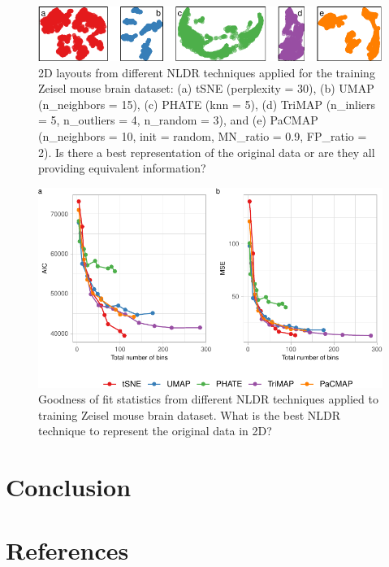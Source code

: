 \documentclass[
  12pt]{article}
\begin{document}
\begin{figure}

{\centering \includegraphics[width=1\textwidth,height=\textheight]{paper_files/figure-pdf/fig-nldervis5Mouse-1.pdf}

}

\caption{\label{fig-nldervis5Mouse}2D layouts from different NLDR
techniques applied for the training Zeisel mouse brain dataset: (a) tSNE
(perplexity = 30), (b) UMAP (n\_neighbors = 15), (c) PHATE (knn = 5),
(d) TriMAP (n\_inliers = 5, n\_outliers = 4, n\_random = 3), and (e)
PaCMAP (n\_neighbors = 10, init = random, MN\_ratio = 0.9, FP\_ratio =
2). Is there a best representation of the original data or are they all
providing equivalent information?}

\end{figure}

\begin{figure}

{\centering \includegraphics[width=1\textwidth,height=\textheight]{paper_files/figure-pdf/fig-diagnosticpltZEI-1.pdf}

}

\caption{\label{fig-diagnosticpltZEI}Goodness of fit statistics from
different NLDR techniques applied to training Zeisel mouse brain
dataset. What is the best NLDR technique to represent the original data
in 2D?}

\end{figure}

\hypertarget{sec-conclusion}{%
\section{Conclusion}\label{sec-conclusion}}

\hypertarget{references}{%
\section*{References}\label{references}}

\renewcommand{\bibsection}{}


\newpage{}
\end{document}
